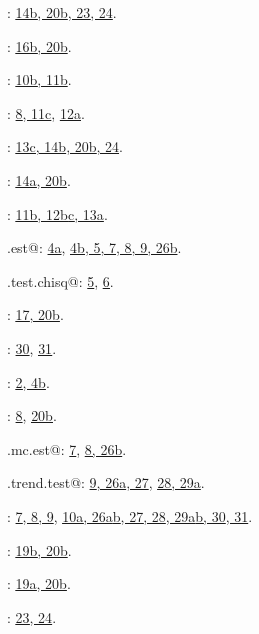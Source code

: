 \documentclass[reqno]{amsart}
\renewcommand{\NWlink}[2]{\hyperlink{#1}{#2}}
\begin{document}
{\small\begin{list}{}{\setlength{\itemsep}{-\parsep}\setlength{\itemindent}{-\leftmargin}}
\item \verb@CalcMarginals@: \underline{\NWlink{nuweb14b}{14b}}\NWlink{nuweb20b}{, 20b}\NWlink{nuweb23}{, 23}\NWlink{nuweb24}{, 24}.
\item \verb@CalcTopD@: \underline{\NWlink{nuweb16b}{16b}}\NWlink{nuweb20b}{, 20b}.
\item \verb@Comb@: \underline{\NWlink{nuweb10b}{10b}}\NWlink{nuweb11b}{, 11b}.
\item \verb@DownUpMatrix@: \NWlink{nuweb8}{8}\NWlink{nuweb11c}{, 11c}, \underline{\NWlink{nuweb12a}{12a}}.
\item \verb@HyperTable@: \underline{\NWlink{nuweb13c}{13c}}\NWlink{nuweb14b}{, 14b}\NWlink{nuweb20b}{, 20b}\NWlink{nuweb24}{, 24}.
\item \verb@IndexVectorC@: \underline{\NWlink{nuweb14a}{14a}}\NWlink{nuweb20b}{, 20b}.
\item \verb@makeSmatrix@: \underline{\NWlink{nuweb11b}{11b}}\NWlink{nuweb12b}{, 12b}\NWlink{nuweb12c}{c}\NWlink{nuweb13a}{, 13a}.
\item \verb@mc.est@: \NWlink{nuweb4a}{4a}, \underline{\NWlink{nuweb4b}{4b}}\NWlink{nuweb5}{, 5}\NWlink{nuweb7}{, 7}\NWlink{nuweb8}{, 8}\NWlink{nuweb9}{, 9}\NWlink{nuweb26b}{, 26b}.
\item \verb@mc.test.chisq@: \NWlink{nuweb5}{5}, \underline{\NWlink{nuweb6}{6}}.
\item \verb@NegLogLik@: \underline{\NWlink{nuweb17}{17}}\NWlink{nuweb20b}{, 20b}.
\item \verb@NOSTASOT@: \NWlink{nuweb30}{30}, \underline{\NWlink{nuweb31}{31}}.
\item \verb@ReprodEstimates@: \underline{\NWlink{nuweb2}{2}}\NWlink{nuweb4b}{, 4b}.
\item \verb@ReprodISDM@: \NWlink{nuweb8}{8}, \underline{\NWlink{nuweb20b}{20b}}.
\item \verb@SO.mc.est@: \NWlink{nuweb7}{7}, \underline{\NWlink{nuweb8}{8}}\NWlink{nuweb26b}{, 26b}.
\item \verb@SO.trend.test@: \NWlink{nuweb9}{9}\NWlink{nuweb26a}{, 26a}\NWlink{nuweb27}{, 27}, \underline{\NWlink{nuweb28}{28}}\NWlink{nuweb29a}{, 29a}.
\item \verb@soControl@: \NWlink{nuweb7}{7}\NWlink{nuweb8}{, 8}\NWlink{nuweb9}{, 9}, \underline{\NWlink{nuweb10a}{10a}}\NWlink{nuweb26a}{, 26a}\NWlink{nuweb26b}{b}\NWlink{nuweb27}{, 27}\NWlink{nuweb28}{, 28}\NWlink{nuweb29a}{, 29a}\NWlink{nuweb29b}{b}\NWlink{nuweb30}{, 30}\NWlink{nuweb31}{, 31}.
\item \verb@UpdateMarginals@: \underline{\NWlink{nuweb19b}{19b}}\NWlink{nuweb20b}{, 20b}.
\item \verb@UpdateQ@: \underline{\NWlink{nuweb19a}{19a}}\NWlink{nuweb20b}{, 20b}.
\item \verb@UpdateReprodQ@: \underline{\NWlink{nuweb23}{23}}\NWlink{nuweb24}{, 24}.
\end{list}}
\end{document}

